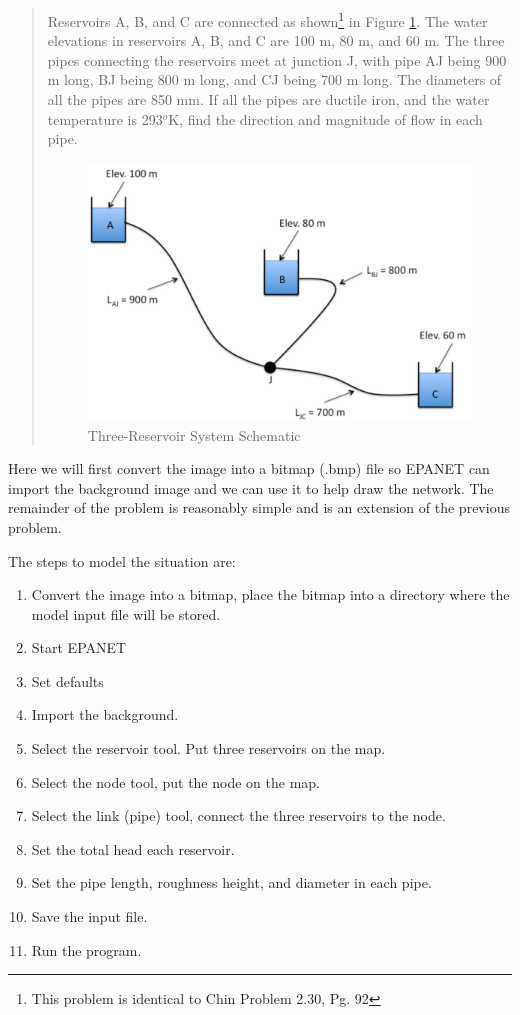 \begin{quote}
Reservoirs A, B, and C are connected as shown\footnote{This problem is identical to Chin Problem 2.30, Pg. 92} in Figure \ref{fig:p230}.  The water elevations in reservoirs A, B, and C are 100 m, 80 m, and 60 m.   The three pipes connecting the reservoirs meet at junction J, with pipe AJ being 900 m long, BJ being 800 m long, and CJ being 700 m long.  The diameters of all the pipes are
850 mm.  If all the pipes are ductile iron, and the water temperature is 293$^o$K, find the direction and magnitude of flow in each pipe.

\begin{figure}[htbp] %
   \centering
   \includegraphics[width=5in]{p230.pdf} 
   \caption{Three-Reservoir System Schematic}
   \label{fig:p230}
\end{figure}
\end{quote}

Here we will first convert the image into a bitmap (.bmp) file so EPANET can import the background image and we can use it to help draw the network.  The remainder of the problem is reasonably simple and is an extension of the previous problem.

The steps to model the situation are:
\begin{enumerate}
\item Convert the image into a bitmap, place the bitmap into a directory where the model input file will be stored.
\item Start EPANET
\item Set defaults
\item Import the background.
\item Select the reservoir tool.  Put three reservoirs on the map.
\item Select the node tool, put the node on the map.
\item Select the link (pipe) tool, connect the three reservoirs to the node.  
\item Set the total head each reservoir.
\item Set the pipe length, roughness height, and diameter in each pipe.
\item Save the input file.
\item Run the program.   
\end{enumerate}

